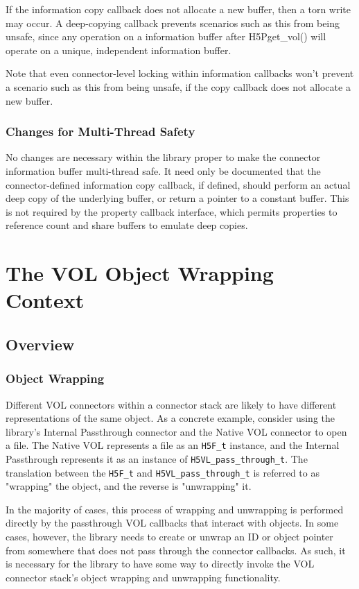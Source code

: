 \documentclass{article}
\begin{document}
If the information copy callback does not allocate a new buffer, then a torn write may occur. A deep-copying callback prevents scenarios such as this from being unsafe, since any operation on a information buffer after H5Pget\_vol() will operate on a unique, independent information buffer.

Note that even connector-level locking within information callbacks won't prevent a scenario such as this from being unsafe, if the copy callback does not allocate a new buffer.

\subsubsection{Changes for Multi-Thread Safety}

No changes are necessary within the library proper to make the connector information buffer multi-thread safe. It need only be documented that the connector-defined information copy callback, if defined, should perform an actual deep copy of the underlying buffer, or return a pointer to a constant buffer. This is not required by the property callback interface, which permits properties to reference count and share buffers to emulate deep copies.

\section{The VOL Object Wrapping Context}

\subsection{Overview}

\subsubsection{Object Wrapping}

Different VOL connectors within a connector stack are likely to have different representations of the same object. As a concrete example, consider using the library's Internal Passthrough connector and the Native VOL connector to open a file. The Native VOL represents a file as an \texttt{H5F\_t} instance, and the Internal Passthrough represents it as an instance of \texttt{H5VL\_pass\_through\_t}. The translation between the \texttt{H5F\_t} and \texttt{H5VL\_pass\_through\_t} is referred to as "wrapping" the object, and the reverse is "unwrapping" it.

In the majority of cases, this process of wrapping and unwrapping is performed directly by the passthrough VOL callbacks that interact with objects. In some cases, however, the library needs to create or unwrap an ID or object pointer from somewhere that does not pass through the connector callbacks. As such, it is necessary for the library to have some way to directly invoke the VOL connector stack's object wrapping and unwrapping functionality.
\end{document}
